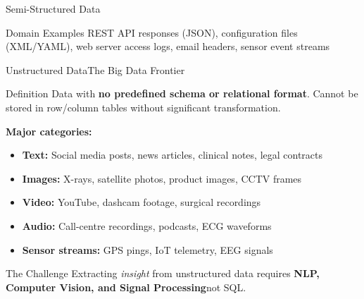 \documentclass[aspectratio=169,10pt]{beamer}
\begin{document}
\begin{frame} {Semi-Structured Data}
     \vspace{4pt}
     \begin{exampleblock}{Domain Examples}
        REST API responses (JSON), configuration files (XML/YAML), web server access logs, email headers, sensor event streams
      \end{exampleblock}
\end{frame}
\begin{frame}{Unstructured Data\textemdash The Big Data Frontier}
      \begin{block}{Definition}
        Data with \textbf{no predefined schema or relational format}.  Cannot be stored in row/column tables without significant transformation.
      \end{block}
      \vspace{4pt}
      \textbf{Major categories:}
      \begin{itemize}
        \item \textbf{Text:} Social media posts, news articles, clinical notes, legal contracts
        \item \textbf{Images:} X-rays, satellite photos, product images, CCTV frames
        \item \textbf{Video:} YouTube, dashcam footage, surgical recordings
        \item \textbf{Audio:} Call-centre recordings, podcasts, ECG waveforms
        \item \textbf{Sensor streams:} GPS pings, IoT telemetry, EEG signals
      \end{itemize}
      \vspace{4pt}
      \begin{alertblock}{The Challenge}
        Extracting \emph{insight} from unstructured data requires \textbf{NLP, Computer Vision, and Signal Processing}\textemdash not SQL.
      \end{alertblock}


\end{frame}
\end{document}
